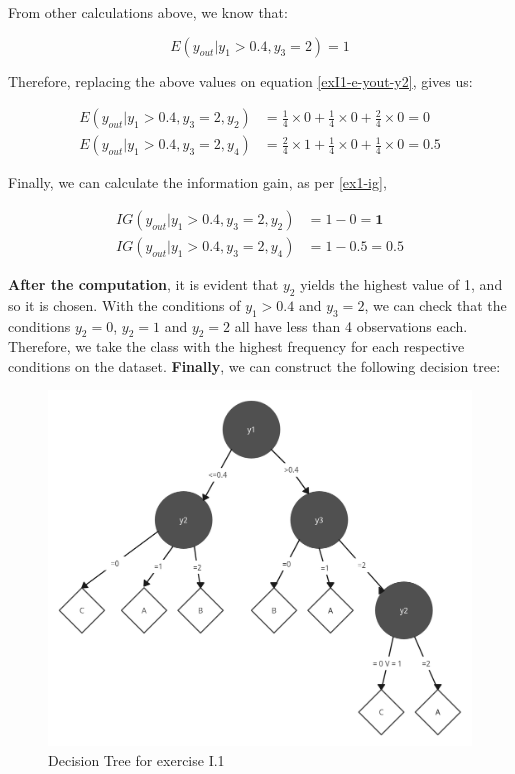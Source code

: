 \documentclass[12pt]{article}
\begin{document}
\begin{enumerate}[leftmargin=\labelsep]
        From other calculations above, we know that:

        \[
          E(y_{out} | y_1 > 0.4 , y_3 = 2) = 1
        \]

        Therefore, replacing the above values on equation \eqref{exI1-e-yout-y2}, gives us:

        \[
          \begin{aligned}
            E(y_{out} | y_1>0.4, y_3 = 2, y_2) & = \frac{1}{4} \times 0 + \frac{1}{4} \times 0 + \frac{2}{4} \times 0 = 0   \\
            E(y_{out} | y_1>0.4, y_3 = 2, y_4) & = \frac{2}{4} \times 1 + \frac{1}{4} \times 0 + \frac{1}{4} \times 0 = 0.5
          \end{aligned}
        \]

        Finally, we can calculate the information gain, as per \eqref{ex1-ig},

        \[
          \begin{aligned}
            IG(y_{out} |y_1 > 0.4, y_3 = 2, y_{2}) & = 1 - 0 = \textbf{1} \\
            IG(y_{out} |y_1 > 0.4, y_3 = 2, y_{4}) & = 1 - 0.5 = 0.5
          \end{aligned}
        \]

        \textbf{After the computation}, it is evident that $y_2$ yields the highest value of 1, and so it is chosen. With the conditions of $y_1 > 0.4$ and $y_3 = 2$, we
        can check that the conditions $y_2 = 0$, $y_2 = 1$ and $y_2 = 2$ all have less than 4 observations each. Therefore, we take the class with the highest frequency
        for each respective conditions on the dataset. \textbf{Finally}, we can construct the following decision tree:

        \begin{figure}[H]
          \centering
          \includegraphics[width=12cm]{./assets/decision_tree_ex1_PartI.png}
          \caption{Decision Tree for exercise I.1}
          \label{fig:decision_tree}
        \end{figure}


\end{enumerate}
\end{document}
